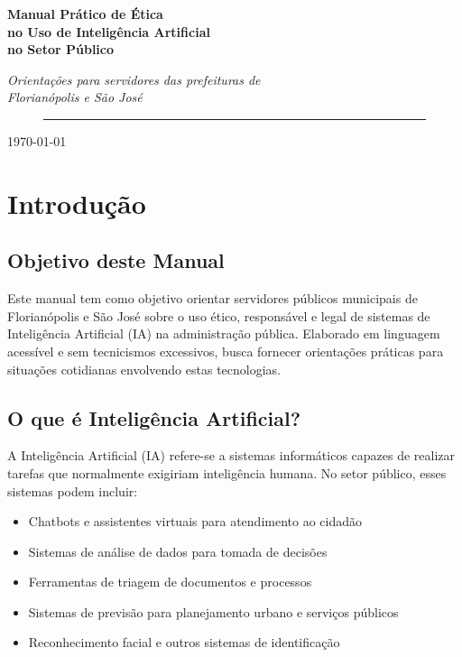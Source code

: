\documentclass[12pt,a4paper]{article}
\begin{document}
\begin{titlepage}
\centering
\vspace*{2cm}
{\Huge\bfseries Manual Prático de Ética\\no Uso de Inteligência Artificial\\no Setor Público\par}
\vspace{2cm}
{\Large\itshape Orientações para servidores das prefeituras de\\Florianópolis e São José\par}
\vspace{4cm}

\begin{figure}[h]
\centering
\rule{8cm}{4cm} %
\end{figure}

\vspace{3cm}
{\large \today\par}
\end{titlepage}

\tableofcontents
\newpage

\section{Introdução}

\subsection{Objetivo deste Manual}
Este manual tem como objetivo orientar servidores públicos municipais de Florianópolis e São José sobre o uso ético, responsável e legal de sistemas de Inteligência Artificial (IA) na administração pública. Elaborado em linguagem acessível e sem tecnicismos excessivos, busca fornecer orientações práticas para situações cotidianas envolvendo estas tecnologias.

\subsection{O que é Inteligência Artificial?}
A Inteligência Artificial (IA) refere-se a sistemas informáticos capazes de realizar tarefas que normalmente exigiriam inteligência humana. No setor público, esses sistemas podem incluir:

\begin{itemize}
    \item Chatbots e assistentes virtuais para atendimento ao cidadão
    \item Sistemas de análise de dados para tomada de decisões
    \item Ferramentas de triagem de documentos e processos
    \item Sistemas de previsão para planejamento urbano e serviços públicos
    \item Reconhecimento facial e outros sistemas de identificação
\end{itemize}
\end{document}
